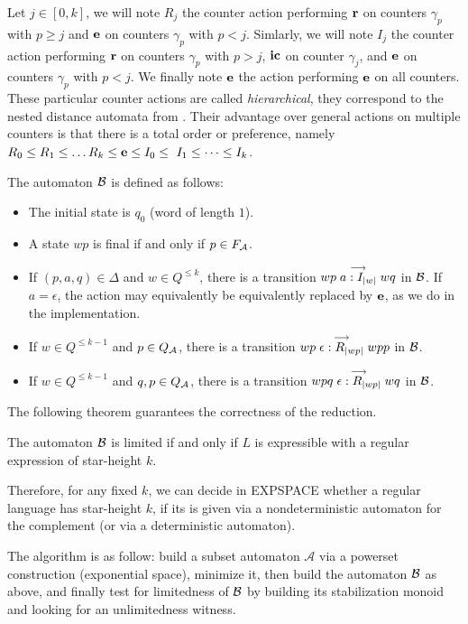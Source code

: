 Let $j\in[0,k]$, we will note $R_j$ the counter action performing $\mathbf{r}$ on counters $\gamma_p$ with $p\geq j$ and $\mathbf{e}$ on counters $\gamma_p$ with $p<j$. Simlarly, we will note $I_j$ the counter action performing $\mathbf{r}$ on counters $\gamma_p$ with $p> j$, $\mathbf{ic}$ on counter $\gamma_j$, and $\mathbf{e}$ on counters $\gamma_p$ with $p<j$. We finally note $\mathbf{e}$ the action performing $\mathbf{e}$ on all counters.
These particular counter actions are called \emph{hierarchical}, they correspond to the nested distance automata from \cite{Kirsten05}. Their advantage over general actions on multiple counters is that there is a total order or preference, namely $R_0\leq R_1\leq\dots R_k\leq \e\leq I_0\leq\ I_1\leq\dots\leq I_k$. 

The automaton $\mathcal B$ is defined as follows:

\begin{itemize}
\item The initial state is $q_0$ (word of length $1$).
\item A state $wp$ is final if and only if $p\in F_{\mathcal{A}}$.
\item If $(p,a,q)\in\Delta$ and $w\in Q^{\leq k}$, there is a transition $wp\stackrel{\longrightarrow}{a:I_{|w|}}wq$ in $\mathcal B$. If $a=\epsilon$, the action may equivalently be equivalently replaced by $\mathbf{e}$, as we do in the implementation.
\item If $w\in Q^{\leq k-1}$ and $p\in Q_{\mathcal{A}}$, there is a transition $wp\stackrel{\longrightarrow}{\epsilon:R_{|wp|}}wpp$ in $\mathcal B$.
\item If $w\in Q^{\leq k-1}$ and $q,p\in Q_{\mathcal{A}}$, there is a transition $wpq\stackrel{\longrightarrow}{\epsilon:R_{|wp|}}wq$ in $\mathcal B$.
\end{itemize}


The following theorem guarantees the correctness of the reduction.
\begin{theorem}\cite{CL08sh}
The automaton $\mathcal B$ is limited if and only if $L$ is expressible with a regular expression of star-height $k$.
\end{theorem}

Therefore, for any fixed $k$, we can decide in EXPSPACE whether a regular language has star-height $k$, if its is given via a nondeterministic automaton for the complement (or via a deterministic automaton).

The algorithm is as follow: build a subset automaton $\mathcal A$ via a powerset construction (exponential space), minimize it, then build the automaton $\mathcal B$ as above, and finally test for limitedness of $\mathcal B$ by building its stabilization monoid and looking for an unlimitedness witness.
